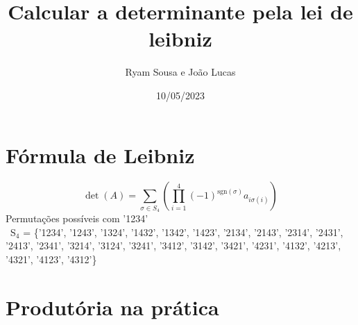 \documentclass{article}
\title{Calcular a determinante pela lei de leibniz}
\author{Ryam Sousa e João Lucas}
\date{10/05/2023}
\begin{document}
    \maketitle
    \section{Fórmula de Leibniz}
    
    
    \[
    \det(A) = \sum_{\sigma \in S_4} \left( \prod_{i=1}^{4} (-1)^{\mathrm{sgn}(\sigma)} a_{i\sigma(i)} \right)
    \] \newline
    Permutações possíveis com '1234'\newline\\
    \ {S}$_4$ = \{'1234', '1243', '1324', '1432', '1342', '1423', 
    '2134', '2143', '2314', '2431', '2413', '2341', 
    '3214', '3124', '3241', '3412', '3142', '3421', 
    '4231', '4132', '4213', '4321', '4123', '4312'\} \newline
    
    \section{Produtória na prática}
    
\end{document}
